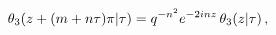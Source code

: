 \[\mathop{\theta_{3}\/}\nolimits\!\left(z+(m+n\tau)\pi\middle|\tau\right)=q^{-n^%
{2}}e^{-2inz}\mathop{\theta_{3}\/}\nolimits\!\left(z\middle|\tau\right),\]
